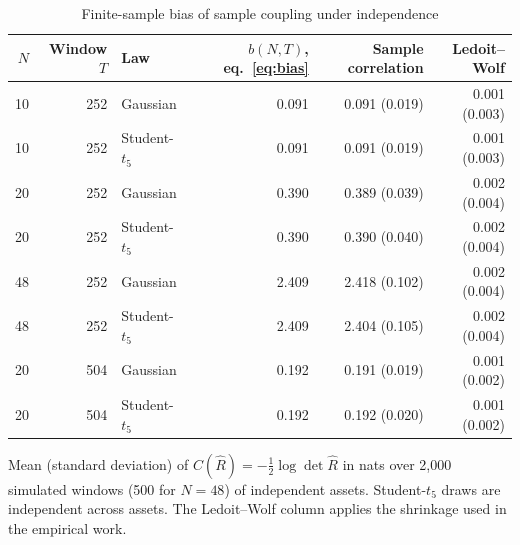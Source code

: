 \begin{table}[p]\centering\small
\caption{Finite-sample bias of sample coupling under independence}\label{tab:bias}
\begin{tabular}{@{}rrlrrr@{}}\toprule
$N$ & Window $T$ & Law & $b(N,T)$, eq.~\eqref{eq:bias} & Sample correlation & Ledoit--Wolf \\\midrule
10 & 252 & Gaussian & 0.091 & 0.091 (0.019) & 0.001 (0.003) \\
10 & 252 & Student-$t_5$ & 0.091 & 0.091 (0.019) & 0.001 (0.003) \\
20 & 252 & Gaussian & 0.390 & 0.389 (0.039) & 0.002 (0.004) \\
20 & 252 & Student-$t_5$ & 0.390 & 0.390 (0.040) & 0.002 (0.004) \\
48 & 252 & Gaussian & 2.409 & 2.418 (0.102) & 0.002 (0.004) \\
48 & 252 & Student-$t_5$ & 2.409 & 2.404 (0.105) & 0.002 (0.004) \\
20 & 504 & Gaussian & 0.192 & 0.191 (0.019) & 0.001 (0.002) \\
20 & 504 & Student-$t_5$ & 0.192 & 0.192 (0.020) & 0.001 (0.002) \\
\bottomrule\end{tabular}
\par\medskip\begin{minipage}{0.95\linewidth}\footnotesize
Mean (standard deviation) of $C(\hat R)=-\frac12\log\det\hat R$ in nats over 2,000 simulated windows (500 for $N=48$) of independent assets.
Student-$t_5$ draws are independent across assets. The Ledoit--Wolf column applies the shrinkage used in the empirical work.
\end{minipage}
\end{table}

